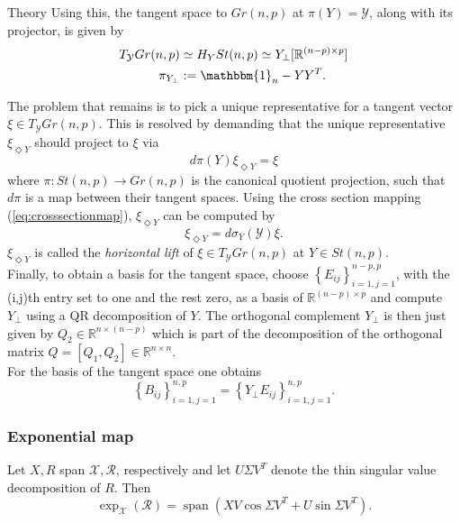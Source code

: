 \begin{chapter}{Theory}
Using this, the tangent space to $Gr(n,p)$ at $\pi(Y)=\mathcal{Y}$, along with its projector, is given by 
\begin{align}
    \label{eq:grassmann_tangentspace}
    T_{\mathcal{Y}}Gr(n,p)&\simeq  H_YSt(n,p)\simeq Y_{\bot}[\mathbb{R}^{(n-p)\times p}]\\
    \pi_{Y_{\bot}}&:=\mathbbm{1}_n-YY^T.
\end{align}

The problem that remains is to pick a unique representative for a tangent vector $\xi\in T_{\mathcal{Y}}Gr(n,p)$.
This is resolved by demanding that the unique representative $\xi_{\Diamond Y}$ should project to $\xi$ via
\begin{equation}
d\pi(Y)\xi_{\Diamond Y}=\xi
\end{equation}
where $\pi: St(n,p)\to Gr(n,p)$ is the canonical quotient projection, such that $d\pi$ is a map between their 
tangent spaces. Using the cross section mapping (\ref{eq:crosssectionmap}), $\xi_{\Diamond Y}$ can be computed by
\begin{equation}
\xi_{\Diamond Y} = d\sigma_Y(\mathcal{Y})\xi.
\end{equation}
$\xi_{\Diamond Y}$ is called the \emph{horizontal lift} of $\xi\in T_{\mathcal{Y}}Gr(n,p)$ at $Y\in St(n,p)$.\\

Finally, to obtain a basis for the tangent space, choose $\left\lbrace E_{ij}\right\rbrace_{i=1,j=1}^{n-p,p}$, with the (i,j)th entry set to one and the rest zero,
as a basis of $\mathbb{R}^{(n-p)\times p}$ and compute $Y_{\bot}$ using a QR decomposition of $Y$. The orthogonal complement $Y_{\bot}$ is then just given by 
$Q_2\in\mathbb{R}^{n\times (n-p)}$ which is part of the decomposition of the orthogonal matrix $Q=[Q_1,Q_2]\in\mathbb{R}^{n\times n}$.\\
For the basis of the tangent space one obtains
\begin{equation}
    \left\lbrace B_{ij}\right\rbrace_{i=1,j=1}^{n,p}=\left\lbrace Y_{\bot}E_{ij}\right\rbrace_{i=1,j=1}^{n,p}.
\end{equation}


\subsubsection{Exponential map} %
\label{ssub:Exponential map}
Let $X, R$ span $\mathcal{X}, \mathcal{R}$, respectively and let $U\Sigma V^{T}$ denote the thin singular value decomposition of $R$. Then
\begin{equation}
    \exp_{\mathcal{X}}(\mathcal{R})=\operatorname{span}\left( XV\cos\Sigma V^T + U\sin\Sigma V^T\right).
\end{equation}


\end{chapter}
